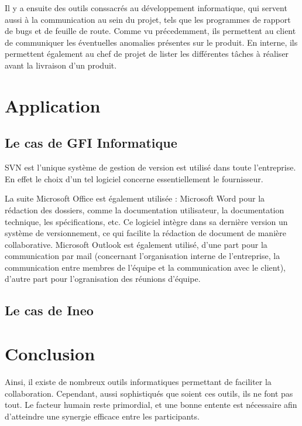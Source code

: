 Il y a ensuite des outils conssacrés au développement informatique, qui servent aussi à la communication au sein du projet, tels que les programmes de rapport de bugs et de feuille de route. Comme vu précedemment, ils permettent au client de communiquer les éventuelles anomalies présentes sur le produit. En interne, ils permettent également au chef de projet de lister les différentes tâches à réaliser avant la livraison d'un produit.

\section{Application}

\subsection{Le cas de GFI Informatique}

SVN est l'unique système de gestion de version est utilisé dans toute l'entreprise. En effet le choix d'un tel logiciel concerne essentiellement le fournisseur.

La suite Microsoft Office est également utilisée :
Microsoft Word pour la rédaction des dossiers, comme la documentation utilisateur, la documentation technique, les spécifications, etc. Ce logiciel intègre dans sa dernière version un système de versionnement, ce qui facilite la rédaction de document de manière collaborative.
Microsoft Outlook est également utilisé, d'une part pour la communication par mail (concernant l'organisation interne de l'entreprise, la communication entre membres de l'équipe et la communication avec le client), d'autre part pour l'ogranisation des réunions d'équipe.

\subsection{Le cas de Ineo}

\section{Conclusion}

Ainsi, il existe de nombreux outils informatiques permettant de faciliter la collaboration. Cependant, aussi sophistiqués que soient ces outils, ils ne font pas tout. Le facteur humain reste primordial, et une bonne entente est nécessaire afin d’atteindre une synergie efficace entre les participants.

